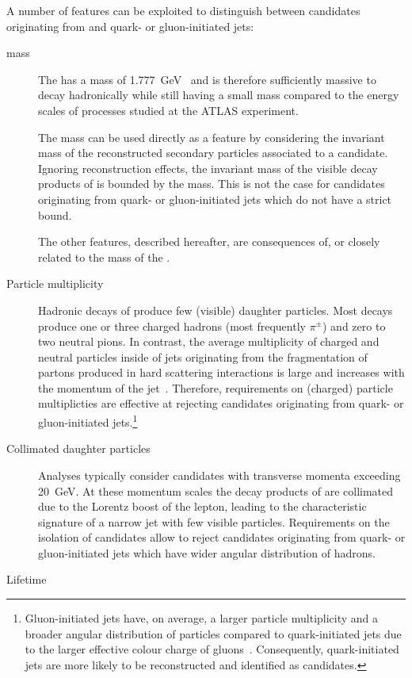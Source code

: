 A number of features can be exploited to distinguish between
\tauhadvis candidates originating from \tauhad and quark- or
gluon-initiated jets:
\begin{description}

\item[\taulepton mass] The \taulepton has a mass of
  \SI{1.777}{\GeV}~\cite{pdg2020} and is therefore sufficiently
  massive to decay hadronically while still having a small mass
  compared to the energy scales of processes studied at the ATLAS
  experiment.

  The \taulepton mass can be used directly as a feature by considering
  the invariant mass of the reconstructed secondary particles
  associated to a \tauhadvis candidate. Ignoring reconstruction
  effects, the invariant mass of the visible decay products of \tauhad
  is bounded by the \taulepton mass. This is not the case for
  \tauhadvis candidates originating from quark- or gluon-initiated
  jets which do not have a strict bound.

  The other features, described hereafter, are consequences of, or
  closely related to the mass of the \taulepton.

\item[Particle multiplicity] Hadronic decays of \tauleptons produce
  few (visible) daughter particles. Most decays produce one or three
  charged hadrons (most frequently $\pi^{\pm}$) and zero to two
  neutral pions.
  In contrast, the average multiplicity of charged and neutral
  particles inside of jets originating from the fragmentation of
  partons produced in hard scattering interactions is large and
  increases with the momentum of the
  jet~\cite{Ellis:1996mzs,STDM-2015-12}. Therefore, requirements on
  (charged) particle multiplicties are effective at rejecting
  \tauhadvis candidates originating from quark- or gluon-initiated
  jets.\footnote{Gluon-initiated jets have, on average, a larger
    particle multiplicity and a broader angular distribution of
    particles compared to quark-initiated jets due to the larger
    effective colour charge of
    gluons~\cite{Ellis:1996mzs}. Consequently, quark-initiated jets
    are more likely to be reconstructed and identified as \tauhadvis
    candidates.}

\item[Collimated daughter particles] Analyses typically consider
  \tauhadvis candidates with transverse momenta exceeding
  \SI{20}{\GeV}. At these momentum scales the decay products of
  \tauleptons are collimated due to the Lorentz boost of the lepton,
  leading to the characteristic signature of a narrow jet with few
  visible particles. Requirements on the isolation of \tauhadvis
  candidates allow to reject candidates originating from quark- or
  gluon-initiated jets which have wider angular distribution of
  hadrons.

\item[Lifetime]

\end{description}

